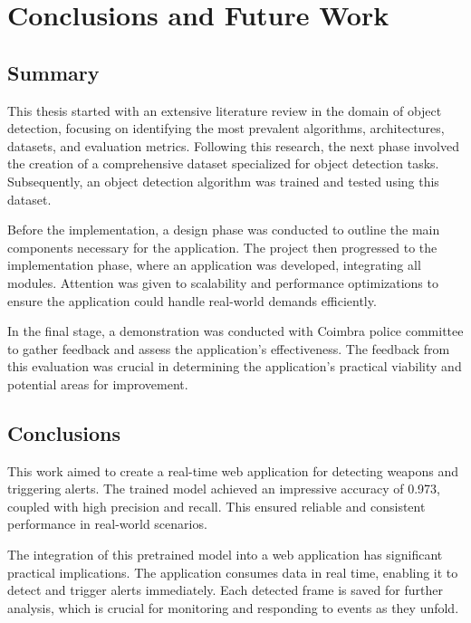 \chapter{Conclusions and Future Work}
\label{chapter:conclusion}

\newenvironment{conclusion}
{\quote\itshape}
{\endquote}

\begin{conclusion}
\end{conclusion}

\section{Summary}
This thesis started with an extensive literature review in the domain of object detection, focusing on 
identifying the most prevalent algorithms, architectures, datasets, and evaluation metrics. Following this 
research, the next phase involved the creation of a comprehensive dataset specialized for object 
detection tasks. Subsequently, an object detection algorithm was trained and tested using this dataset.

Before the implementation, a design phase was conducted to outline the main components necessary for the application.
The project then progressed to the implementation phase, where an application was developed, integrating all 
modules. Attention was given to scalability and performance optimizations to ensure the application 
could handle real-world demands efficiently.

In the final stage, a demonstration was conducted with Coimbra police committee to gather feedback and assess 
the application's effectiveness. The feedback from this evaluation was crucial in determining the application's 
practical viability and potential areas for improvement.

\section{Conclusions}
This work aimed to create a real-time web application for detecting weapons and triggering alerts.
The trained model achieved an impressive accuracy of 0.973, coupled with high precision and recall. This ensured 
reliable and consistent performance in real-world scenarios.

The integration of this pretrained model into a web application has significant practical implications. The application 
consumes data in real time, enabling it to detect and trigger alerts immediately. Each detected frame is saved for 
further analysis, which is crucial for monitoring and responding to events as they unfold.

